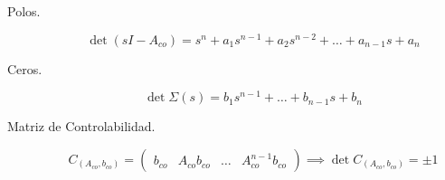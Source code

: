         \begin{description}
            \item [Polos.]

            \begin{equation}
                \det{(sI - A_{co})} = s^n + a_1 s^{n-1} + a_2 s^{n-2} + \dots + a_{n-1} s + a_n
            \end{equation}

            \item [Ceros.]

            \begin{equation}
                \det{\Sigma(s)} = b_1 s^{n-1} + \dots + b_{n-1} s + b_n
            \end{equation}

            \item [Matriz de Controlabilidad.]

            \begin{equation}
                C_{(A_{co}, b_{co})} =
                \begin{pmatrix}
                    b_{co} & A_{co} b_{co} & \dots & A_{co}^{n-1} b_{co}
                \end{pmatrix} \implies \det{C_{(A_{co}, b_{co})}} = \pm 1
            \end{equation}
        \end{description}